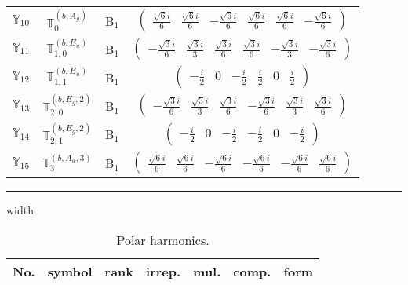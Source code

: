 \documentclass[fleqn,10pt,landscape]{article}
\begin{document}
\begin{itemize}
\begin{center}
\begin{longtable}{c|c|c|c}
$ \mathbb{Y}_{10} $ & $\mathbb{T}_{0}^{(b,A_{g})}$ & B$_{1}$ & $\begin{pmatrix} \frac{\sqrt{6} i}{6} & \frac{\sqrt{6} i}{6} & - \frac{\sqrt{6} i}{6} & \frac{\sqrt{6} i}{6} & \frac{\sqrt{6} i}{6} & - \frac{\sqrt{6} i}{6} \end{pmatrix}$ \\
$ \mathbb{Y}_{11} $ & $\mathbb{T}_{1,0}^{(b,E_{u})}$ & B$_{1}$ & $\begin{pmatrix} - \frac{\sqrt{3} i}{6} & \frac{\sqrt{3} i}{3} & \frac{\sqrt{3} i}{6} & \frac{\sqrt{3} i}{6} & - \frac{\sqrt{3} i}{3} & - \frac{\sqrt{3} i}{6} \end{pmatrix}$ \\
$ \mathbb{Y}_{12} $ & $\mathbb{T}_{1,1}^{(b,E_{u})}$ & B$_{1}$ & $\begin{pmatrix} - \frac{i}{2} & 0 & - \frac{i}{2} & \frac{i}{2} & 0 & \frac{i}{2} \end{pmatrix}$ \\
$ \mathbb{Y}_{13} $ & $\mathbb{T}_{2,0}^{(b,E_{g},2)}$ & B$_{1}$ & $\begin{pmatrix} - \frac{\sqrt{3} i}{6} & \frac{\sqrt{3} i}{3} & \frac{\sqrt{3} i}{6} & - \frac{\sqrt{3} i}{6} & \frac{\sqrt{3} i}{3} & \frac{\sqrt{3} i}{6} \end{pmatrix}$ \\
$ \mathbb{Y}_{14} $ & $\mathbb{T}_{2,1}^{(b,E_{g},2)}$ & B$_{1}$ & $\begin{pmatrix} - \frac{i}{2} & 0 & - \frac{i}{2} & - \frac{i}{2} & 0 & - \frac{i}{2} \end{pmatrix}$ \\
$ \mathbb{Y}_{15} $ & $\mathbb{T}_{3}^{(b,A_{u},3)}$ & B$_{1}$ & $\begin{pmatrix} \frac{\sqrt{6} i}{6} & \frac{\sqrt{6} i}{6} & - \frac{\sqrt{6} i}{6} & - \frac{\sqrt{6} i}{6} & - \frac{\sqrt{6} i}{6} & \frac{\sqrt{6} i}{6} \end{pmatrix}$ \\
\end{longtable}
\end{center}

 \hfil \hrule height 1mm width \textwidth \hfil

\begin{center}
\renewcommand{\arraystretch}{1.3}
\begin{longtable}{ccccccc}
\caption{Polar harmonics.}
 \\
 \hline \hline
No. & symbol & rank & irrep. & mul. & comp. & form \\ \hline \endfirsthead


\end{longtable}
\end{center}
\end{itemize}
\end{document}
